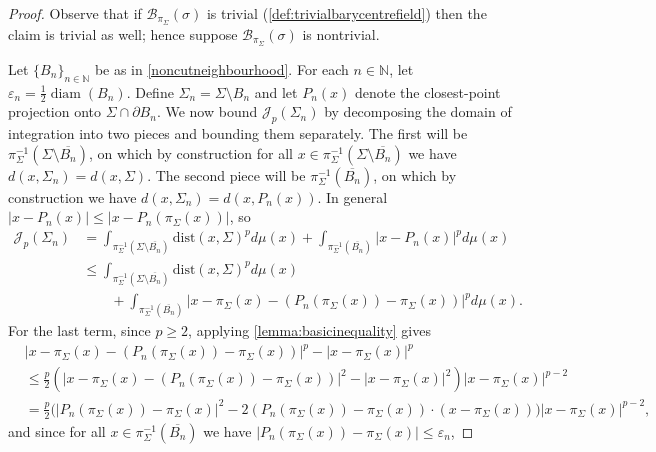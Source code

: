 \documentclass[10pt,a4paper]{amsart}
\DeclareMathOperator*{\diam}{diam}
\newcommand{\dist}{\mathrm{dist}}
\renewcommand{\epsilon}{\varepsilon}
\begin{document}
\begin{proof}
  Observe that if $\mathcal{B}_{\pi_\Sigma}(\sigma)$ is trivial
  (\cref{def:trivialbarycentrefield}) then the claim is trivial as
  well; hence suppose $\mathcal{B}_{\pi_\Sigma}(\sigma)$ is
  nontrivial.

  Let $\{B_n\}_{n \in \mathbb{N}}$ be as in
  \cref{noncutneighbourhood}. For each $n \in \mathbb{N}$, let
  $\epsilon_n = \frac{1}{2}\diam(B_{n})$. Define $\Sigma_n = \Sigma
  \setminus B_n$ and let $P_n(x)$ denote the closest-point projection
  onto $\Sigma \cap \partial B_n$. We now bound $\mathscr
  J_p(\Sigma_n)$ by decomposing the domain of integration into two
  pieces and bounding them separately. The first will be
  $\pi_\Sigma^{-1}(\Sigma \setminus \overline{B_n})$, on which by
  construction for all $x \in \pi_\Sigma^{-1}(\Sigma \setminus
  \overline{B_n})$ we have $d(x, \Sigma_n) = d(x, \Sigma)$. The second
  piece will be $\pi_\Sigma^{-1}(\overline{B_n})$, on which by
  construction we have $d(x, \Sigma_n) = d(x, P_n(x))$. In general $|x
  - P_n(x)| \leq |x - P_n(\pi_\Sigma(x))|$, so
  \begin{align*}
    \mathscr{J}_p(\Sigma_n)
    & = \int_{\pi_{\Sigma}^{-1}(\Sigma \setminus
      \overline{B_n})}\dist(x, \Sigma)^p d\mu(x) +
      \int_{\pi_{\Sigma}^{-1}(\overline{B_n})}|x- P_n(x)|^p d\mu(x)\\
    &\leq \int_{\pi_{\Sigma}^{-1}(\Sigma \setminus
      \overline{B_n})}\dist(x, \Sigma)^p d\mu(x) \\
    & \qquad + \int_{\pi_{\Sigma}^{-1}(\overline{B_n})}|x-
      \pi_{\Sigma}(x) - (P_n(\pi_{\Sigma}(x)) - \pi_{\Sigma}(x))|^p
      d\mu(x).
  \end{align*}
  For the last term, since $p \ge 2$, applying
  \cref{lemma:basicinequality} gives
  \begin{align*}
    & |x - \pi_{\Sigma}(x)
      -(P_{n}(\pi_{\Sigma}(x)) - \pi_{\Sigma}(x))|^p - |x -
      \pi_{\Sigma}(x)|^p \\
    &\leq \frac{p}{2}( |x - \pi_{\Sigma}(x) -(P_{n}(\pi_{\Sigma}(x))
      - \pi_{\Sigma}(x))|^2 - |x - \pi_{\Sigma}(x)|^2
      )|x-\pi_{\Sigma}(x)|^{p-2} \\
    &= \frac{p}{2}\Big(
      |P_{n}(\pi_{\Sigma}(x)) - \pi_{\Sigma}(x)|^2
      - 2(P_{n}(\pi_{\Sigma}(x)) - \pi_{\Sigma}(x))\cdot
      (x - \pi_{\Sigma}(x)) \Big)|x - \pi_{\Sigma}(x)|^{p-2},
  \end{align*}
  and since for all $x \in \pi_\Sigma^{-1}( \overline{B_n})$ we have
  $|P_{n}(\pi_{\Sigma}(x)) - \pi_{\Sigma}(x)| \leq \epsilon_n$,

\end{proof}
\end{document}
